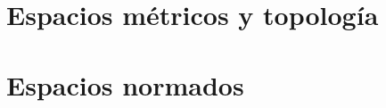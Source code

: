 \documentclass[11pt, a4paper, oneside]{book}
\theoremstyle{plain}
\theoremstyle{definition}
\theoremstyle{remark}
\begin{document}






\part{Espacios métricos y topología}















\part{Espacios normados}




\end{document}
